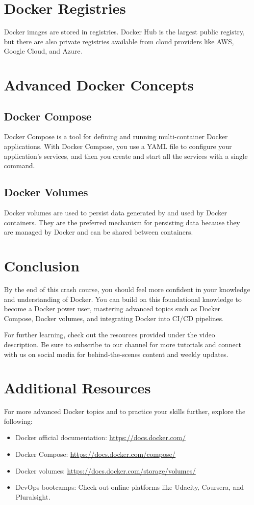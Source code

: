 \documentclass[12pt]{article}
\begin{document}
\section{Docker Registries}
Docker images are stored in registries. Docker Hub is the largest public registry, but there are also private registries available from cloud providers like AWS, Google Cloud, and Azure.

\section{Advanced Docker Concepts}
\subsection{Docker Compose}
Docker Compose is a tool for defining and running multi-container Docker applications. With Docker Compose, you use a YAML file to configure your application's services, and then you create and start all the services with a single command.

\subsection{Docker Volumes}
Docker volumes are used to persist data generated by and used by Docker containers. They are the preferred mechanism for persisting data because they are managed by Docker and can be shared between containers.

\section{Conclusion}
By the end of this crash course, you should feel more confident in your knowledge and understanding of Docker. You can build on this foundational knowledge to become a Docker power user, mastering advanced topics such as Docker Compose, Docker volumes, and integrating Docker into CI/CD pipelines.

For further learning, check out the resources provided under the video description. Be sure to subscribe to our channel for more tutorials and connect with us on social media for behind-the-scenes content and weekly updates.

\section{Additional Resources}
For more advanced Docker topics and to practice your skills further, explore the following:
\begin{itemize}
    \item Docker official documentation: \url{https://docs.docker.com/}
    \item Docker Compose: \url{https://docs.docker.com/compose/}
    \item Docker volumes: \url{https://docs.docker.com/storage/volumes/}
    \item DevOps bootcamps: Check out online platforms like Udacity, Coursera, and Pluralsight.
\end{itemize}
\end{document}
